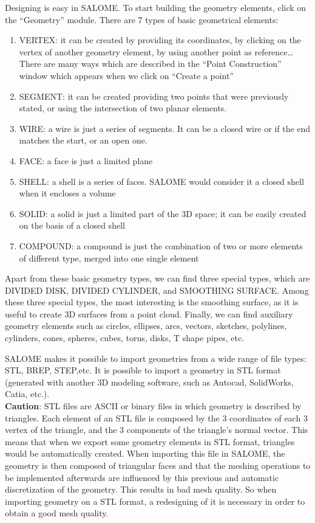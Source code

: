 \documentclass{../GPUSPHtemplate}
\begin{document}
Designing is easy in SALOME. To start building the geometry 
elements, click on the “Geometry” module. 
There are 7 types of basic geometrical elements:
\begin{enumerate}
\item VERTEX: it can be created by providing its coordinates, 
by clicking on the vertex of another geometry element, 
by using another point as reference…There are many ways 
which are described in the “Point Construction” window 
which appears when we click on “Create a point”
\item SEGMENT: it can be created providing two points 
that were previously stated, or using the intersection of 
two planar elements. 
\item WIRE: a wire is just a series of segments. 
It can be a closed wire or if the end matches the start, 
or an open one.
\item FACE: a face is just a limited plane 
\item SHELL: a shell is a series of faces. 
SALOME would consider it a closed shell when it 
encloses a volume
\item SOLID: a solid is just a limited part of the 3D space; 
it can be easily created on the basis of a closed shell
\item COMPOUND: a compound is just the combination 
of two or more elements of different type, merged 
into one single element
\end{enumerate}
Apart from these basic geometry types, we can find 
three special types, which are 
DIVIDED DISK, DIVIDED CYLINDER, and SMOOTHING SURFACE. 
Among these three special types, the most interesting 
is the smoothing surface, as it is useful to create 
3D surfaces from a point cloud.
Finally, we can find auxiliary geometry elements such as 
circles, ellipses, arcs, vectors, sketches, polylines, cylinders, 
cones, spheres, cubes, torus, disks, T shape pipes, etc.

SALOME makes it possible to import geometries from 
a wide range of file types: STL, BREP, STEP,etc. 
It is possible to import a geometry in STL format 
(generated with another 3D modeling software, such 
as Autocad, SolidWorks, Catia, etc.). \\

\textbf{Caution}: STL files are ASCII or binary 
files in which geometry is described by triangles. 
Each element of an STL file is composed by the 3 
coordinates of each 3 vertex of the triangle, 
and the 3 components of the triangle’s normal vector. 
This means that when we export some geometry 
elements in STL format, triangles would be automatically created. 
When importing this file in SALOME, the geometry is then 
composed of triangular faces and that the meshing operations 
to be implemented afterwards are influenced by this previous 
and automatic discretization of the geometry.
This results in bad mesh quality.
So when importing geometry on a STL format, a redesigning of it is necessary 
in order to obtain a good mesh quality.\\
\end{document}
